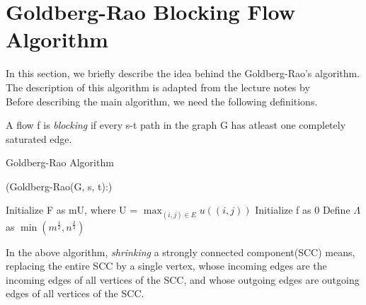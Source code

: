 \documentclass[BTech]{iitmdiss}
\begin{document}
	      
	    
	   \section{Goldberg-Rao Blocking Flow Algorithm}
	    In this section, we briefly describe the idea behind the Goldberg-Rao's algorithm. The description of this algorithm is adapted from 
	    the lecture notes by \cite{williamson} \\
	    
	    Before describing the main algorithm, we need the following definitions. \\
	    
	    
	    
	    \begin{defn}
	      A flow f is \textit{blocking} if every s-t path in the graph G has atleast one completely saturated edge. \\
	    \end{defn}

	    
	    
	    \begin{algorithm}[H]
	      \caption{Goldberg-Rao Algorithm}
	      
	      \Begin(Goldberg-Rao{(G, s, t)}:)
	      {
		Initialize F as mU, where U =  $\displaystyle\max_{(i,j) \in E} u((i,j))$ \;
		Initialize f as 0 \;
		Define $\varLambda$ as $\min(m^{\frac{1}{2}}, n^{\frac{2}{3}})$ \;
		
	      }
	    \end{algorithm}
	    
	    In the above algorithm, \textit{shrinking} a strongly connected component(SCC) means, replacing the entire SCC by a 
	    single vertex, whose incoming edges are the incoming edges of all vertices of the SCC, and whose outgoing edges
	    are outgoing edges of all vertices of the SCC. \\
	    
\end{document}
